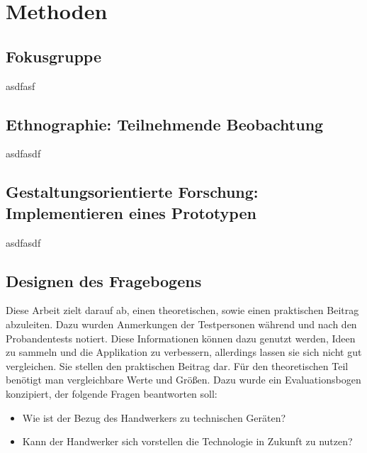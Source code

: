 \chapter{Methoden}

\section{Fokusgruppe}

asdfasf

\section{Ethnographie: Teilnehmende Beobachtung}

asdfasdf

\section{Gestaltungsorientierte Forschung: Implementieren eines Prototypen}

asdfasdf

\section{Designen des Fragebogens}

Diese Arbeit zielt darauf ab, einen theoretischen, sowie einen praktischen Beitrag abzuleiten. Dazu wurden Anmerkungen der Testpersonen während und nach den Probandentests notiert. Diese Informationen können dazu genutzt werden, Ideen zu sammeln und die Applikation zu verbessern, allerdings lassen sie sich nicht gut vergleichen. Sie stellen den praktischen Beitrag dar. Für den theoretischen Teil benötigt man vergleichbare Werte und Größen. Dazu wurde ein Evaluationsbogen konzipiert, der folgende Fragen beantworten soll:

\begin{itemize}
	\item Wie ist der Bezug des Handwerkers zu technischen Geräten?
	\item Kann der Handwerker sich vorstellen die Technologie in Zukunft zu nutzen?
\end{itemize}

